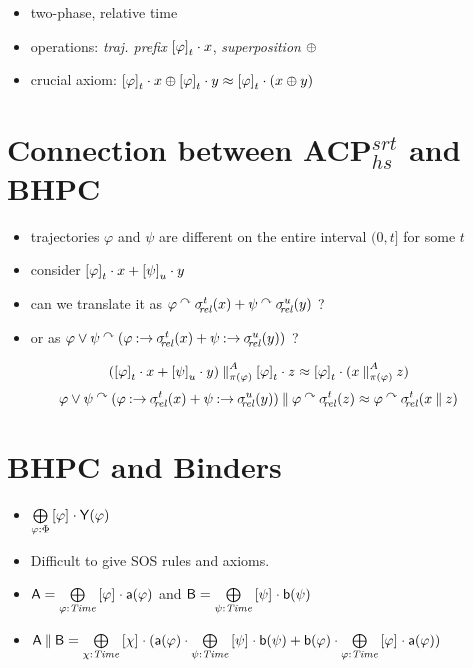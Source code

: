 \begin{slide}
\begin{itemize}
\begin{itemize}
  \item two-phase, relative time 
  \item operations: \emph{traj. prefix} $\tpref{\varphi}{t}\seqc x$, \emph{superposition} $\superps$
  \item crucial axiom: $\tpref{\varphi}{t}\seqc x\superps \tpref{\varphi}{t}\seqc y\id \tpref{\varphi}{t}\seqc (x\superps y)$
  \end{itemize}
\end{itemize}
\newslide\section*{Connection between ACP$^{srt}_{hs}$ and BHPC}
\begin{itemize}
\item trajectories $\varphi$ and $\psi$ are different on the entire interval $(0,t]$ for some $t$
\item consider $\tpref{\varphi}{t}\seqc x+\tpref{\psi}{u}\seqc y$
\item can we translate it as $\varphi\csins\delay{t}(x)+\psi\csins\delay{u}(y)$ ?
\pause
\item or as $\varphi\vee\psi\csins(\varphi\cond\delay{t}(x)+\psi\cond\delay{u}(y))$ ?
\end{itemize}

\[(\tpref{\varphi}{t}\seqc x+\tpref{\psi}{u}\seqc y)\parc^A_{\pi(\varphi)}\tpref{\varphi}{t}\seqc z\id \tpref{\varphi}{t}\seqc (x\parc^A_{\pi(\varphi)} z)\]
\[\varphi\vee\psi\csins(\varphi\cond\delay{t}(x)+\psi\cond\delay{u}(y))\parc\varphi\csins\delay{t}(z)\id \varphi\csins\delay{t}(x\parc z)\] 
\newslide\section*{BHPC and Binders}
\begin{itemize}
\item $\superpos{\varphi\ap\Phi}\tpref{\varphi}{}\seqc \pr{Y}(\varphi)$
\item Difficult to give SOS rules and axioms.
\item $\pr{A}=\superpos{\varphi\ap\Time}\tpref{\varphi}{}\seqc\act{a}(\varphi)$ 
and $\pr{B}=\superpos{\psi\ap\Time}\tpref{\psi}{}\seqc\act{b}(\psi)$
\item $\pr{A}\parc\pr{B}=\superpos{\chi\ap\Time}\tpref{\chi}{}\seqc(\act{a}(\varphi)\seqc\superpos{\psi\ap\Time}\tpref{\psi}{}\seqc\act{b}(\psi)+\act{b}(\varphi)\seqc\superpos{\varphi\ap\Time}\tpref{\varphi}{}\seqc\act{a}(\varphi))$
\end{itemize}


\end{slide}
